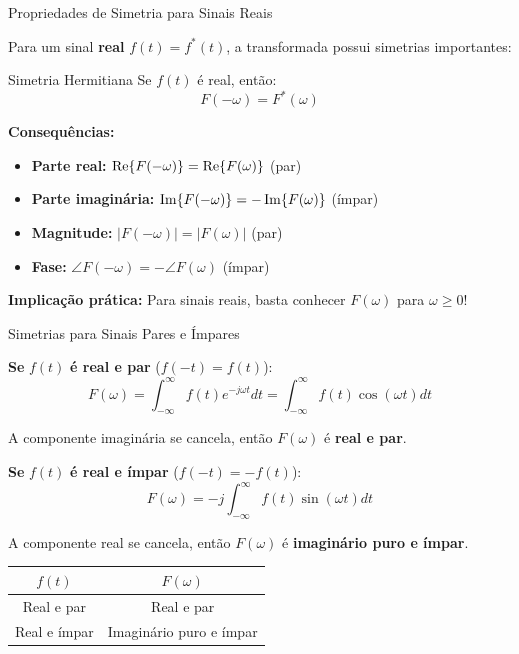 \begin{frame}{Propriedades de Simetria para Sinais Reais}

Para um sinal \textbf{real} $f(t) = f^*(t)$, a transformada possui simetrias importantes:

\begin{block}{Simetria Hermitiana}
Se $f(t)$ é real, então:
\[
F(-\omega) = F^*(\omega)
\]
\end{block}

\textbf{Consequências:}

\begin{itemize}
\item \textbf{Parte real:} $\operatorname{Re}\{F(-\omega)\} = \operatorname{Re}\{F(\omega)\}$ (par)
\item \textbf{Parte imaginária:} $\operatorname{Im}\{F(-\omega)\} = -\operatorname{Im}\{F(\omega)\}$ (ímpar)
\item \textbf{Magnitude:} $|F(-\omega)| = |F(\omega)|$ (par)
\item \textbf{Fase:} $\angle F(-\omega) = -\angle F(\omega)$ (ímpar)
\end{itemize}

\vspace{0.3cm}

\textbf{Implicação prática:} Para sinais reais, basta conhecer $F(\omega)$ para $\omega \geq 0$!

\end{frame}


\begin{frame}{Simetrias para Sinais Pares e Ímpares}

\textbf{Se} $f(t)$ \textbf{é real e par} ($f(-t) = f(t)$):
\vspace{-2mm}
\[
F(\omega) = \int_{-\infty}^{\infty} f(t) e^{-j\omega t} dt = \int_{-\infty}^{\infty} f(t) \cos(\omega t) dt
\]
\vspace{-5mm}

A componente imaginária se cancela, então $F(\omega)$ é \textbf{real e par}.

\textbf{Se} $f(t)$ \textbf{é real e ímpar} ($f(-t) = -f(t)$):
\vspace{-2mm}
\[
F(\omega) = -j \int_{-\infty}^{\infty} f(t) \sin(\omega t) dt
\]
\vspace{-5mm}

A componente real se cancela, então $F(\omega)$ é \textbf{imaginário puro e ímpar}.

\vspace{1mm}

\begin{center}
\small
\begin{tabular}{|c|c|}
\hline
$f(t)$ & $F(\omega)$ \\
\hline
Real e par & Real e par \\
Real e ímpar & Imaginário puro e ímpar \\
\hline
\end{tabular}
\end{center}

\end{frame}

